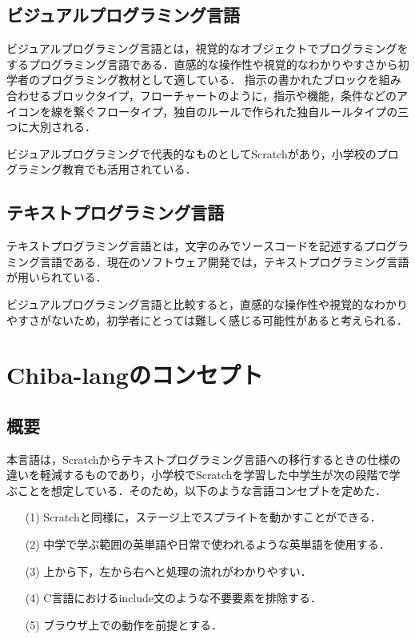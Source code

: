 \documentclass[10pt,a4j]{ltjsarticle}
\begin{document}
\subsection{ビジュアルプログラミング言語}
ビジュアルプログラミング言語とは，視覚的なオブジェクトでプログラミングをするプログラミング言語である．直感的な操作性や視覚的なわかりやすさから初学者のプログラミング教材として適している．
指示の書かれたブロックを組み合わせるブロックタイプ，フローチャートのように，指示や機能，条件などのアイコンを線を繋ぐフロータイプ，独自のルールで作られた独自ルールタイプの三つに大別される．

ビジュアルプログラミングで代表的なものとしてScratchがあり，小学校のプログラミング教育でも活用されている．
\subsection{テキストプログラミング言語}
テキストプログラミング言語とは，文字のみでソースコードを記述するプログラミング言語である．現在のソフトウェア開発では，テキストプログラミング言語が用いられている．

ビジュアルプログラミング言語と比較すると，直感的な操作性や視覚的なわかりやすさがないため，初学者にとっては難しく感じる可能性があると考えられる．
\clearpage

\section{Chiba-langのコンセプト}
\subsection{概要}
本言語は，Scratchからテキストプログラミング言語への移行するときの仕様の違いを軽減するものであり，小学校でScratchを学習した中学生が次の段階で学ぶことを想定している．そのため，以下のような言語コンセプトを定めた．

\begin{enumerate}
   \item[(1)] Scratchと同様に，ステージ上でスプライトを動かすことができる．
   \item[(2)] 中学で学ぶ範囲の英単語や日常で使われるような英単語を使用する．
   \item[(3)] 上から下，左から右へと処理の流れがわかりやすい．
   \item[(4)] C言語におけるinclude文のような不要要素を排除する．
   \item[(5)] ブラウザ上での動作を前提とする．
\end{enumerate}
\end{document}
